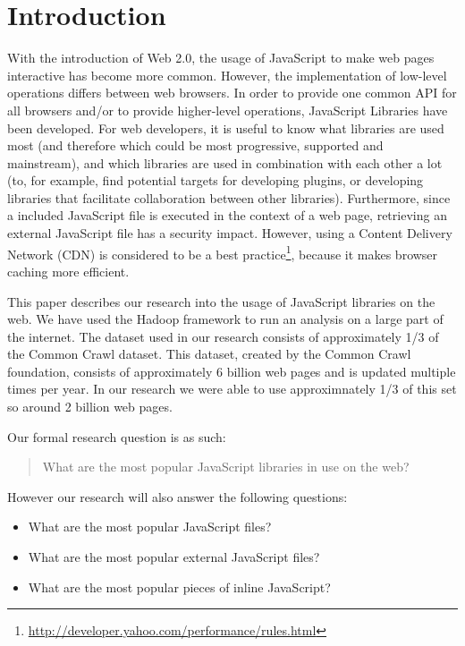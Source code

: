 \section{Introduction}
With the introduction of Web 2.0, the usage of JavaScript to make web pages interactive has become more common. However, the implementation of low-level operations differs between web browsers. In order to provide one common API for all browsers and/or to provide higher-level operations, JavaScript Libraries have been developed. For web developers, it is useful to know what libraries are used most (and therefore which could be most progressive, supported and mainstream), and which libraries are used in combination with each other a lot (to, for example, find potential targets for developing plugins, or developing libraries that facilitate collaboration between other libraries).
Furthermore, since a included JavaScript file is executed in the context of a web page, retrieving an external JavaScript file has a security impact. However, using a Content Delivery Network (CDN) is considered to be a best practice\footnote{\url{http://developer.yahoo.com/performance/rules.html}}, because it makes browser caching more efficient.

This paper describes our research into the usage of JavaScript libraries on the web. We have used the Hadoop framework to run an analysis on a large part of the internet. The dataset used in our research consists of approximately 1/3 of the Common Crawl dataset. This dataset, created by the Common Crawl foundation, consists of approximately 6 billion web pages and is updated multiple times per year. In our research we were able to use approximnately 1/3 of this set so around 2 billion web pages.

Our formal research question is as such:

\begin{quote}
What are the most popular JavaScript libraries in use on the web?
\end{quote}

However our research will also answer the following questions:

\begin{itemize}
	\item What are the most popular JavaScript files?
	\item What are the most popular external JavaScript files?
	\item What are the most popular pieces of inline JavaScript?
\end{itemize}

